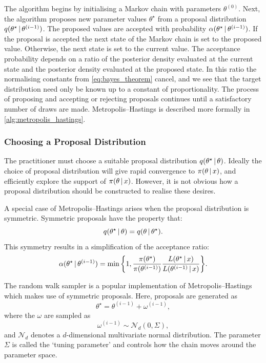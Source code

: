 The algorithm begins by initialising a Markov chain with parameters $\theta^{(0)}$. Next,
the algorithm proposes new parameter values $\theta^\star$ from a proposal distribution
$q(\theta^\star \,|\, \theta^{(i-1)})$. The proposed values are accepted with probability
$\alpha(\theta^\star \,|\, \theta^{(i-1)})$. If the proposal is accepted the next state
of the Markov chain is set to the proposed value. Otherwise, the next state is set to the
current value. The acceptance probability depends on a ratio of the posterior density
evaluated at the current state and the posterior density evaluated at the proposed state.
In this ratio the normalising constants from \cref{eq:bayes_theorem} cancel, and we see
that the target distribution need only be known up to a constant of proportionality. The
process of proposing and accepting or rejecting proposals continues until a satisfactory
number of draws are made.  Metropolis--Hastings is described more formally in
\cref{alg:metropolis_hastings}.

\subsubsection{Choosing a Proposal Distribution}
\label{ssec:proposal_distribution}

The practitioner must choose a suitable proposal distribution $q(\theta^\star \,|\,
\theta)$. Ideally the choice of proposal distribution will give rapid convergence to
$\pi(\theta \,|\, x)$, and efficiently explore the support of $\pi(\theta
\,|\, x)$. However, it is not obvious how a proposal distribution should be constructed
to realise these desires.

A special case of Metropolis--Hastings arises when the proposal distribution is symmetric.
Symmetric proposals have the property that:
\begin{equation*}
  q(\theta^\star \,|\, \theta) = q(\theta \,|\, \theta^\star).
\end{equation*}
This symmetry results in a simplification of the acceptance ratio:
\begin{equation*}
  \alpha({\theta}^\star \given \theta^{(i-1)})
    = \text{min}\,\bigg\{1,
                        \frac{\pi(\theta^\star)}{\pi(\theta^{(i-1)})}%
                        \frac{L(\theta^\star \given  x)}%
                        {L(\theta^{(i-1)} \given  x)}
                  \bigg\}.
\end{equation*}

The random walk sampler is a popular implementation of Metropolis--Hastings which makes
use of symmetric proposals. Here, proposals are generated as
\begin{equation*}
  \theta^\star = \theta^{(i-1)} +  \omega^{(i-1)},
\end{equation*}
where the $\omega$ are sampled as
\begin{equation*}
   \omega^{(i-1)} \sim \mathcal{N}_d(0, \Sigma),
\end{equation*}
and $\mathcal{N}_d$ denotes a $d$-dimensional multivariate normal distribution. The
parameter $\Sigma$ is called the `tuning parameter' and controls how the chain moves around
the parameter space.

